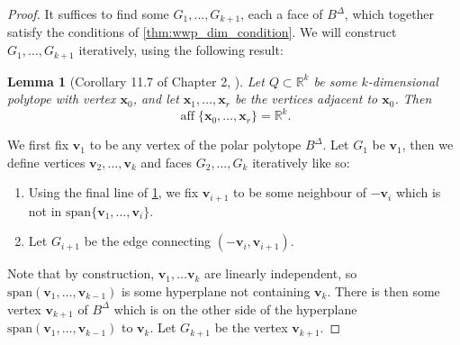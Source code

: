 \documentclass[10pt]{article}
\newtheorem{lemma}[theorem]{Lemma}
\theoremstyle{definition}
\theoremstyle{remark}
\newcommand{\R}{\mathbb{R}}
\DeclareMathOperator{\aff}{aff}
\renewcommand{\vec}[1]{\mathbf{#1}}
\begin{document}
	\begin{proof}
		It suffices to find some $G_1,\dots, G_{k+1}$, each a face of $B^{\Delta}$, which together satisfy the conditions of \cref{thm:wwp_dim_condition}. We will construct $G_1,\dots, G_{k+1}$ iteratively, using the following result:
		
		\begin{lemma}[Corollary 11.7 of Chapter 2,  \cite{brondsted2012introduction}]\label{lem:vertex_neighbours}
			Let $Q \subset \R^k$ be some $k$-dimensional polytope with vertex $\vec x_0$, and let $\vec x_1, \dots, \vec x_r$ be the vertices adjacent to $\vec x_0$. Then
			\[
			\aff \{ \vec x_0,\dots, \vec x_r \} = \R^k.
			\]
		\end{lemma}
		We first fix $\vec v_1$ to be any vertex of the polar polytope $B^{\Delta}$. Let $G_1$ be $\vec v_1$, then we define vertices $\vec v_2, \dots, \vec v_k$ and faces $G_2, \dots, G_{k}$ iteratively like so:
		\begin{enumerate}
			\item Using the final line of \cref{lem:vertex_neighbours}, we fix $\vec v_{i+1}$ to be some neighbour of $-\vec v_i$ which is not in $\text{span} \{\vec v_1,\dots, \vec v_i\}$.
			\item Let $G_{i+1}$ be the edge connecting $(-\vec v_i, \vec v_{i+1})$.
		\end{enumerate}
		Note that by construction, $\vec v_1,\dots \vec v_k$ are linearly independent, so $\text{span}(\vec v_1, \dots, \vec v_{k-1})$ is some hyperplane not containing $\vec v_k$. There is then some vertex $\vec v_{k+1}$ of $B^{\Delta}$ which is on the other side of the hyperplane $\text{span}(\vec v_1, \dots, \vec v_{k-1})$ to $\vec v_k$. Let $G_{k+1}$ be the vertex $\vec v_{k+1}$.
		

\end{proof}
\end{document}
